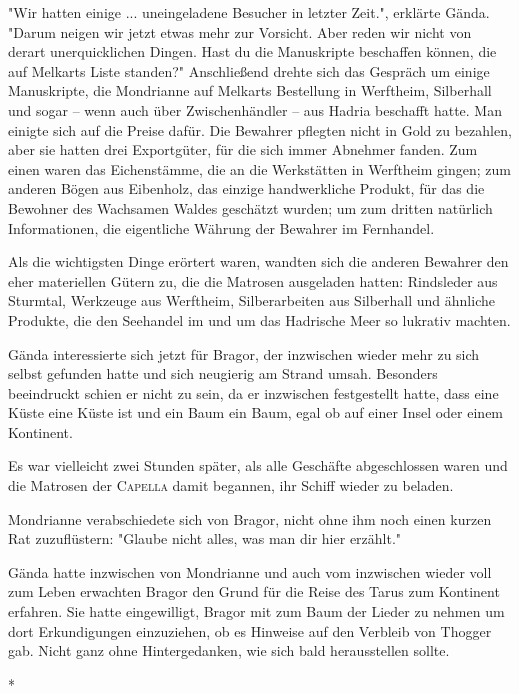 \documentclass[10pt, a4paper, oneside]{book}
\begin{document}
\begin{multicols}{2}
"Wir hatten einige ... uneingeladene Besucher in letzter Zeit.", erklärte Gända. "Darum neigen wir jetzt etwas mehr zur Vorsicht. Aber reden wir nicht von derart unerquicklichen Dingen. Hast du die Manuskripte beschaffen können, die auf Melkarts Liste standen?" 
Anschließend drehte sich das Gespräch um einige Manuskripte, die Mondrianne auf Melkarts Bestellung in Werftheim, Silberhall und sogar – wenn auch über Zwischenhändler – aus Hadria beschafft hatte. Man einigte sich auf die Preise dafür. Die Bewahrer pflegten nicht in Gold zu bezahlen, aber sie hatten drei Exportgüter, für die sich immer Abnehmer fanden. Zum einen waren das Eichenstämme, die an die Werkstätten in Werftheim gingen; zum anderen Bögen aus Eibenholz, das einzige handwerkliche Produkt, für das die Bewohner des Wachsamen Waldes geschätzt wurden; um zum dritten natürlich Informationen, die eigentliche Währung der Bewahrer im Fernhandel. 

Als die wichtigsten Dinge erörtert waren, wandten sich die anderen Bewahrer den eher materiellen Gütern zu, die die Matrosen ausgeladen hatten: Rindsleder aus Sturmtal, Werkzeuge aus Werftheim, Silberarbeiten aus Silberhall und ähnliche Produkte, die den Seehandel im und um das Hadrische Meer so lukrativ machten. 

Gända interessierte sich jetzt für Bragor, der inzwischen wieder mehr zu sich selbst gefunden hatte und sich neugierig am Strand umsah. Besonders beeindruckt schien er nicht zu sein, da er inzwischen festgestellt hatte, dass eine Küste eine Küste ist und ein Baum ein Baum, egal ob auf einer Insel oder einem Kontinent. 

Es war vielleicht zwei Stunden später, als alle Geschäfte abgeschlossen waren und die Matrosen der \textsc{Capella} damit begannen, ihr Schiff wieder zu beladen. 

Mondrianne verabschiedete sich von Bragor, nicht ohne ihm noch einen kurzen Rat zuzuflüstern: "Glaube nicht alles, was man dir hier erzählt." 

Gända hatte inzwischen von Mondrianne und auch vom inzwischen wieder voll zum Leben erwachten Bragor den Grund für die Reise des Tarus zum Kontinent erfahren. Sie hatte eingewilligt, Bragor mit zum Baum der Lieder zu nehmen um dort Erkundigungen einzuziehen, ob es Hinweise auf den Verbleib von Thogger gab. Nicht ganz ohne Hintergedanken, wie sich bald herausstellen sollte. 

\begin{center}
    *
\end{center}


\end{multicols}
\end{document}

